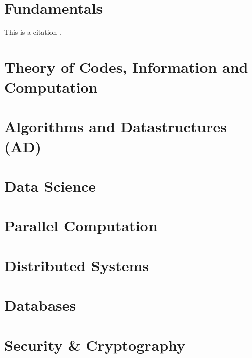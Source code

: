 \documentclass[12pt,twoside]{book}
\begin{document}

\restoregeometry




\part{Fundamentals}
This is a citation \cite{Goodrich}.



\part{Theory of Codes, Information and Computation}

%
%

\part{Algorithms and Datastructures (AD)}


\part{Data Science}


\part{Parallel Computation}
\part{Distributed Systems}
\part{Databases}
\part{Security \& Cryptography}
\end{document}
